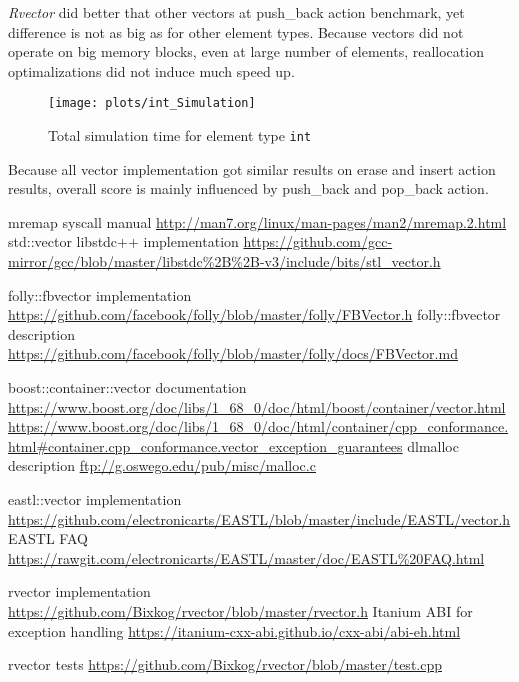 \documentclass[inz, english, shortabstract]{iithesis}
\begin{document}
{\it Rvector} did better that other vectors at push\_back action benchmark, yet difference is not as big as for other element types. Because vectors did not operate on big memory blocks, even at large number of elements, reallocation optimalizations did not induce much speed up.

\begin{figure}[h!]
\caption{Total simulation time for element type \lstinline{int}}
\label{int_simulation}
\texttt{[image: plots/int\_Simulation]}
\end{figure}

Because all vector implementation got similar results on erase and insert action results, overall score is mainly influenced by push\_back and pop\_back action.

\begin{thebibliography}{1}
 mremap syscall manual \url{http://man7.org/linux/man-pages/man2/mremap.2.html}
 std::vector libstdc++ implementation \url{https://github.com/gcc-mirror/gcc/blob/master/libstdc%2B%2B-v3/include/bits/stl_vector.h}

 folly::fbvector implementation \url{https://github.com/facebook/folly/blob/master/folly/FBVector.h}
 folly::fbvector description \url{https://github.com/facebook/folly/blob/master/folly/docs/FBVector.md}

 boost::container::vector documentation \url{https://www.boost.org/doc/libs/1_68_0/doc/html/boost/container/vector.html}
 \url{https://www.boost.org/doc/libs/1_68_0/doc/html/container/cpp_conformance.html#container.cpp_conformance.vector_exception_guarantees}
 dlmalloc description \url{ftp://g.oswego.edu/pub/misc/malloc.c}

 eastl::vector implementation \url{https://github.com/electronicarts/EASTL/blob/master/include/EASTL/vector.h}
 EASTL FAQ \url{https://rawgit.com/electronicarts/EASTL/master/doc/EASTL%20FAQ.html}

 rvector implementation \url{https://github.com/Bixkog/rvector/blob/master/rvector.h}
 Itanium ABI for exception handling \url{https://itanium-cxx-abi.github.io/cxx-abi/abi-eh.html}

 rvector tests \url{https://github.com/Bixkog/rvector/blob/master/test.cpp}
\end{thebibliography}


\listoffigures
\lstlistoflistings
\end{document}
